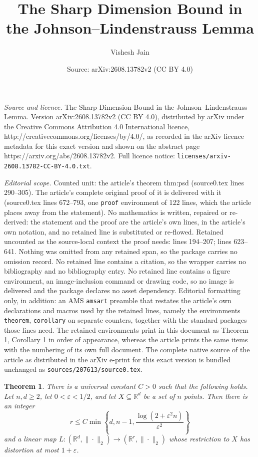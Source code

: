 \documentclass[10pt,a4paper]{amsart}
\title{The Sharp Dimension Bound in the Johnson--Lindenstrauss Lemma}
\author{Vishesh Jain}
\date{Source: arXiv:2608.13782v2 (CC BY 4.0)}
\newtheorem{theorem}{Theorem}
\newcommand{\R}{\mathbb R}
\begin{document}
\maketitle

\noindent\emph{Source and licence.} The Sharp Dimension Bound in the Johnson--Lindenstrauss Lemma. Version arXiv:2608.13782v2 (CC BY 4.0), distributed by arXiv under the Creative Commons Attribution 4.0 International licence, http://creativecommons.org/licenses/by/4.0/, as recorded in the arXiv licence metadata for this exact version and shown on the abstract page https://arxiv.org/abs/2608.13782v2. Full licence notice: \texttt{licenses/arxiv-2608.13782-CC-BY-4.0.txt}.\par\smallskip

\noindent\textit{Editorial scope.} Counted unit: the article's theorem thm:psd (source0.tex lines 290--305). The article's complete original proof of it is delivered with it (source0.tex lines 672--793, one \texttt{proof} environment of 122 lines, which the article places away from the statement). No mathematics is written, repaired or re-derived: the statement and the proof are the article's own lines, in the article's own notation, and no retained line is substituted or re-flowed.  Retained uncounted as the source-local context the proof needs: lines 194--207; lines 623--641.  Nothing was omitted from any retained span, so the package carries no omission record.  No retained line contains a citation, so the wrapper carries no bibliography and no bibliography entry.  No retained line contains a figure environment, an image-inclusion command or drawing code, so no image is delivered and the package declares no asset dependency.  Editorial formatting only, in addition: an AMS \texttt{amsart} preamble that restates the article's own declarations and macros used by the retained lines, namely the environments \texttt{theorem}, \texttt{corollary} on separate counters, together with the standard packages those lines need.  The retained environments print in this document as Theorem 1, Corollary 1 in order of appearance, whereas the article prints the same items with the numbering of its own full document.  The complete native source of the article as distributed in the arXiv e-print for this exact version is bundled unchanged as \texttt{sources/207613/source0.tex}.
\begin{theorem}
\label{thm:jl-main}
There is a universal constant $C>0$ such that the following holds. Let
$n,d\geq2$, let $0<\varepsilon<1/2$, and let $X\subseteq\R^d$ be a set
of $n$ points. Then there is an integer
\[
 r\leq
 C\min\left\{
 d,n-1,\frac{\log(2+\varepsilon^2n)}{\varepsilon^2}
 \right\}
\]
and a linear map $L:(\R^d, \|\cdot \|_2)\to (\R^r, \|\cdot \|_2)$ whose restriction to $X$ has distortion
at most $1+\varepsilon$. 
\end{theorem}
\end{document}
